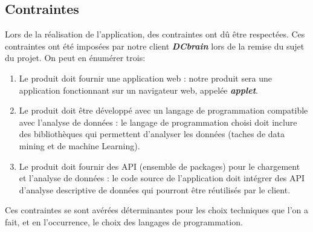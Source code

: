 		\subsection{Contraintes}
		Lors de la réalisation de l'application, des contraintes ont dû être respectées. Ces contraintes ont été imposées par notre client \textbf{\textit{DCbrain}} lors de la remise du sujet du projet. On peut en énumérer trois:
		\begin{enumerate}
			\item Le produit doit fournir une application web : notre produit sera une application fonctionnant sur un navigateur web, appelée \textbf{\textit{applet}}.
			\item Le produit doit être développé avec un langage de programmation compatible avec l'analyse de données : le langage de programmation choisi doit inclure des bibliothèques qui permettent d'analyser les données (taches de data mining et de machine Learning).
			\item Le produit doit fournir des API (ensemble de packages) pour le chargement et l'analyse de données : le code source de l'application doit intégrer des API d'analyse descriptive de données qui pourront être réutilisés par le client.
		\end{enumerate}	
		Ces contraintes se sont avérées déterminantes pour les choix techniques que l'on a fait, et en l'occurrence, le choix des langages de programmation. 
		
